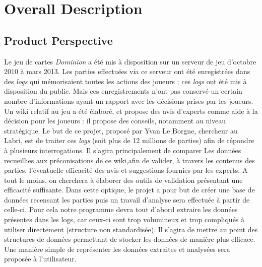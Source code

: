 \documentclass{scrreprt}
\begin{document}
\chapter{Overall Description}

\section{Product Perspective}
  Le jeu de cartes \textit{Dominion} a été mis à disposition sur un serveur de jeu d'octobre 2010 à mars 2013. Les parties effectuées via ce serveur ont été enregistrées dans des \textit{logs} qui mémorisaient toutes les actions des joueurs ; ces \textit{logs} ont été mis à disposition du public. Mais ces enregistrements n'ont pas conservé un certain nombre d'informations ayant un rapport avec les décisions prises par les joueurs.
  \newline Un wiki relatif au jeu a été élaboré, et propose des avis d'experts comme aide à la décision pour les joueurs : il propose des conseils, notamment au niveau stratégique. Le but de ce projet, proposé par Yvan Le Borgne, chercheur au Labri, est de traiter ces \textit{logs} (soit plus de 12 millions de parties) afin de répondre à plusieurs interrogations. Il s'agira principalement de comparer Les données recueillies aux préconisations de ce wiki,afin de valider, à travers les contenus des parties, l'éventuelle efficacité des avis et suggestions fournies par les experts. A tout le moins, on cherchera à élaborer des outils de validation présentant une efficacité suffisante.
   Dans cette optique, le projet a pour but de créer une base de données recensant les parties puis un travail d'analyse sera effectuée à partir de celle-ci.
  Pour cela notre programme devra tout d'abord extraire les données présentes dans les logs, car ceux-ci sont trop volumineux et trop compliqués à utiliser directement (structure non standardisée). Il s'agira de mettre au point des structures de données permettant de stocker les données de manière plus efficace. Une manière simple de représenter les données extraites et analysées sera proposée à l'utilisateur.
\end{document}
